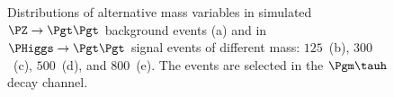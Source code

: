 {{{{{\begin{figure}
\begin{center}
\end{center}
\caption{
  Distributions of alternative mass variables in simulated $\PZ \to \Pgt\Pgt$ background events (a) 
  and in $\PHiggs \to \Pgt\Pgt$ signal events of different mass:
  $125$~\GeV (b), $300$~\GeV (c), $500$~\GeV (d), and $800$~\GeV (e).
  The events are selected in the $\Pgm\tauh$ decay channel.
}
\label{fig:massDistributions_mssm_mutau}
\end{figure}

}}}}}
